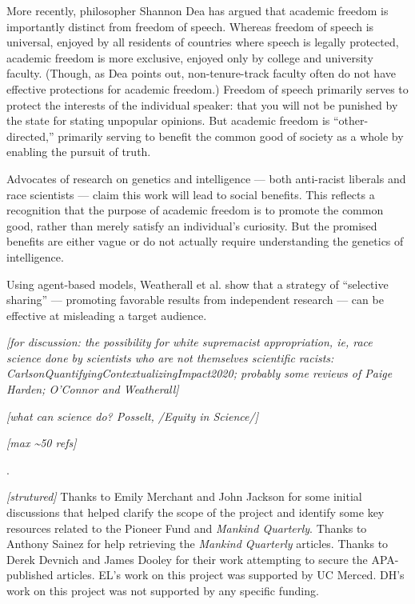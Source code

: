 \documentclass[12pt]{article}
\newcounter{lastnote}
\newenvironment{scilastnote}{%
\setcounter{lastnote}{\value{enumiv}}%
\addtocounter{lastnote}{+1}%
\begin{list}%
{\arabic{lastnote}.}
{\setlength{\leftmargin}{.22in}}
{\setlength{\labelsep}{.5em}}}
{\end{list}}
\begin{document}
More recently, philosopher Shannon Dea \cite{DeaEvolvingSocialPurpose2021} has argued that academic freedom is importantly distinct from freedom of speech. Whereas freedom of speech is universal, enjoyed by all residents of countries where speech is legally protected, academic freedom is more exclusive, enjoyed only by college and university faculty. (Though, as Dea points out, non-tenure-track faculty often do not have effective protections for academic freedom.) Freedom of speech primarily serves to protect the interests of the individual speaker: that you will not be punished by the state for stating unpopular opinions. But academic freedom is ``other-directed,'' primarily serving to benefit the common good of society as a whole by enabling the pursuit of truth.

Advocates of research on genetics and intelligence --- both anti-racist liberals and race scientists --- claim this work will lead to social benefits. This reflects a recognition that the purpose of academic freedom is to promote the common good, rather than merely satisfy an individual's curiosity. But the promised benefits are either vague or do not actually require understanding the genetics of intelligence.\cite{KaplanGaltonQuincunxProbabilistic2021, CoopLotteryLuckLegacy2022}

Using agent-based models, Weatherall et al.\cite{WeatherallHowBeatScience2018} show that a strategy of ``selective sharing'' --- promoting favorable results from independent research --- can be effective at misleading a target audience.

\emph{{[}for discussion: the possibility for white supremacist appropriation, ie, race science done by scientists who are not themselves scientific racists: CarlsonQuantifyingContextualizingImpact2020; probably some reviews of Paige Harden; O'Connor and Weatherall{]}}

\emph{{[}what can science do? Posselt, /Equity in Science/{]}}

\emph{{[}max \textasciitilde50 refs{]}}




\begin{scilastnote}
\item \emph{{[}strutured{]}} Thanks to Emily Merchant and John Jackson for some initial discussions that helped clarify the scope of the project and identify some key resources related to the Pioneer Fund and \emph{Mankind Quarterly}. Thanks to Anthony Sainez for help retrieving the \emph{Mankind Quarterly} articles. Thanks to Derek Devnich and James Dooley for their work attempting to secure the APA-published articles. EL's work on this project was supported by UC Merced. DH's work on this project was not supported by any specific funding.
\end{scilastnote}
\end{document}
